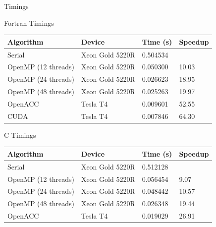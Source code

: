 \documentclass[10pt,t]{beamer}
\begin{document}
\begin{frame}[allowframebreaks]{Timings}
  \begin{exampleblock}{Fortran Timings}
    {\scriptsize
    \begin{center}
      \begin{tabular}{|bbbb|}
        \hline
        \rowcolor{lublue}Algorithm & Device & Time (s) & Speedup \\
        \hline
         Serial & Xeon Gold 5220R & 0.504534 & \\
         \hline
         OpenMP (12 threads) & Xeon Gold 5220R & 0.050300 & 10.03 \\
         OpenMP (24 threads) & Xeon Gold 5220R & 0.026623 & 18.95 \\
         OpenMP (48 threads) & Xeon Gold 5220R & 0.025263 & 19.97 \\
         \hline
         OpenACC & Tesla T4 & 0.009601 & 52.55 \\
         \hline
         CUDA & Tesla T4 & 0.007846 & 64.30 \\
        \hline
      \end{tabular}
    \end{center}
    }
  \end{exampleblock}
  \begin{exampleblock}{C Timings}
    {\scriptsize
    \begin{center}
      \begin{tabular}{|bbbb|}
        \hline
        \rowcolor{lublue}Algorithm & Device & Time (s) & Speedup \\
        \hline
         Serial & Xeon Gold 5220R & 0.512128 & \\
         \hline
         OpenMP (12 threads) & Xeon Gold 5220R & 0.056454 &  9.07 \\
         OpenMP (24 threads) & Xeon Gold 5220R & 0.048442 & 10.57 \\
         OpenMP (48 threads) & Xeon Gold 5220R & 0.026348 & 19.44 \\
         \hline
         OpenACC & Tesla T4 & 0.019029 & 26.91 \\
         \hline
      \end{tabular}
    \end{center}
    }
  \end{exampleblock}
 \end{frame}
\end{document}
